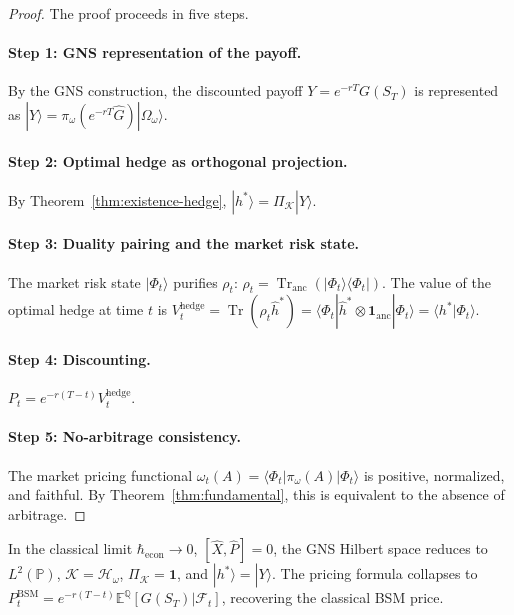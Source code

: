 \begin{proof}
The proof proceeds in five steps.

\paragraph{Step 1: GNS representation of the payoff.}
By the GNS construction, the discounted payoff $Y = e^{-rT} G(S_T)$ is represented
as $|Y\rangle = \pi_\omega(e^{-rT} \hat{G}) |\Omega_\omega\rangle$.

\paragraph{Step 2: Optimal hedge as orthogonal projection.}
By Theorem~\ref{thm:existence-hedge}, $|h^*\rangle = \Pi_{\mathcal{K}} |Y\rangle$.

\paragraph{Step 3: Duality pairing and the market risk state.}
The market risk state $|\Phi_t\rangle$ purifies $\rho_t$:
$\rho_t = \operatorname{Tr}_{\mathrm{anc}}(|\Phi_t\rangle \langle \Phi_t|)$. The
value of the optimal hedge at time $t$ is
$V_t^{\mathrm{hedge}} = \operatorname{Tr}(\rho_t \hat{h}^*)
= \langle \Phi_t | \hat{h}^* \otimes \mathbf{1}_{\mathrm{anc}} | \Phi_t \rangle
= \langle h^* | \Phi_t \rangle$.

\paragraph{Step 4: Discounting.}
$P_t = e^{-r(T-t)} V_t^{\mathrm{hedge}}$.

\paragraph{Step 5: No-arbitrage consistency.}
The market pricing functional
$\omega_t(A) = \langle \Phi_t | \pi_\omega(A) | \Phi_t \rangle$ is positive,
normalized, and faithful. By Theorem~\ref{thm:fundamental}, this is equivalent to
the absence of arbitrage.
\end{proof}

\begin{remark}\label{rem:pricing-bsm-limit}
In the classical limit $\hbar_{\mathrm{econ}} \to 0$, $[\hat{X}, \hat{P}] = 0$, the
GNS Hilbert space reduces to $L^2(\mathbb{P})$, $\mathcal{K} = \mathcal{H}_\omega$,
$\Pi_{\mathcal{K}} = \mathbf{1}$, and $|h^*\rangle = |Y\rangle$. The pricing formula
collapses to
$P_t^{\mathrm{BSM}} = e^{-r(T-t)} \mathbb{E}^{\mathbb{Q}}[G(S_T) | \mathcal{F}_t]$,
recovering the classical BSM price.
\end{remark}

